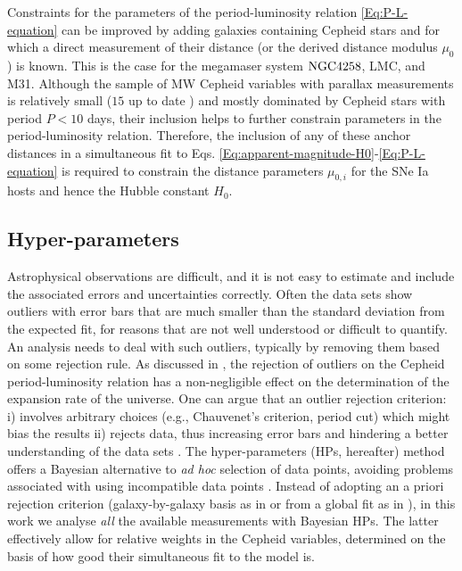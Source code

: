 Constraints for the parameters of the period-luminosity relation \eqref{Eq:P-L-equation} can be improved by adding galaxies containing Cepheid stars and for which a direct measurement of their distance (or the derived distance modulus $\mu_0$) is known. This is the case for the megamaser system $\mathrm{NGC4258}$, LMC, and M31. Although the sample of MW Cepheid variables with parallax measurements is relatively small ($15$ up to date \cite{Riess:2016jrr}) and mostly dominated by Cepheid stars with period $P<10$ days, their inclusion helps to further constrain parameters in the period-luminosity relation. Therefore, the inclusion of any of these anchor distances in a simultaneous fit to Eqs. \eqref{Eq:apparent-magnitude-H0}-\eqref{Eq:P-L-equation} is required to constrain the distance parameters $\mu_{0,i}$ for the SNe Ia hosts and hence the Hubble constant $H_0$. 

\subsection{Hyper-parameters}

Astrophysical observations are difficult, and it is not easy to estimate and include the associated errors and uncertainties correctly. Often the data sets show outliers with error bars that are much smaller than the standard deviation from the expected fit, for reasons that are not well understood or difficult to quantify. An analysis needs to deal with such outliers, typically by removing them based on some rejection rule.
As discussed in \cite{Riess:2009pu,Riess:2011yx,Efstathiou:2013via}, the rejection of outliers on the Cepheid period-luminosity relation has a non-negligible effect on the determination of the expansion rate of the universe. One can argue that an outlier rejection criterion: i) involves arbitrary choices (e.g., Chauvenet's criterion, period cut) which might bias the results ii) rejects data, thus increasing error bars and hindering a better understanding of the data sets \cite{Press:1996fw}. The hyper-parameters (HPs, hereafter) method offers a Bayesian alternative to {\em{ad hoc}} selection of data points, avoiding problems associated with using incompatible data points \cite{Lahav:1999hu}. Instead of adopting an a priori rejection criterion  (galaxy-by-galaxy basis as in \cite{Riess:2009pu,Riess:2011yx} or from a global fit as in \cite{Efstathiou:2013via}), in this work we analyse {\em all} the available measurements with Bayesian HPs. The latter effectively allow for relative weights in the Cepheid variables, determined on the basis of how good their simultaneous fit to the model is. 

